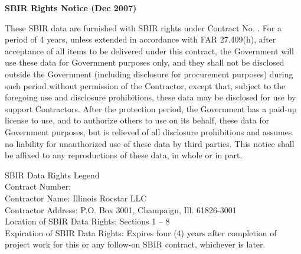 	\newpage
	\begin{center}
		{\large \bf SBIR Rights Notice (Dec 2007)}
	\end{center}
	
	\noindent 
       These SBIR data are furnished with SBIR rights under Contract No. \cnum. For a period of 4 years, unless extended in accordance with FAR 27.409(h), after acceptance of all items to be delivered under this contract, the Government will use these data for Government purposes only, and they shall not be disclosed outside the Government (including disclosure for procurement purposes) during such period without permission of the Contractor, except that, subject to the
       foregoing use and disclosure prohibitions, these data may be disclosed for use by support Contractors. After the protection period, the Government has a paid-up license to use, and to authorize others to use on its behalf, these data for Government purposes, but is relieved of all disclosure prohibitions and assumes no liability for unauthorized use of these data by third parties. This notice shall be affixed to any reproductions of these data, in whole or in part.
               
        \begin{center}
        SBIR Data Rights Legend \\
        Contract Number: \cnum \\
        Contractor Name: Illinois Rocstar LLC \\
        Contractor Address: P.O. Box 3001, Champaign, Ill. 61826-3001 \\
        Location of SBIR Data Rights: Sections 1 -- 8 \\
        Expiration of SBIR Data Rights: Expires four (4) years after completion of project work for this or any follow-on SBIR contract, whichever is later.
        \end{center}
        
       

	\newpage
	
